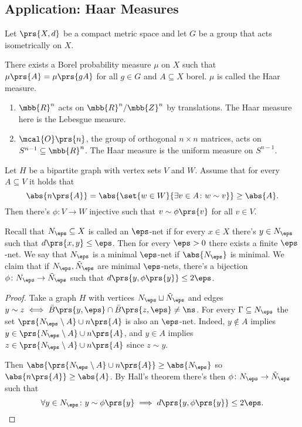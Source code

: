 \documentclass[10pt, twoside]{book}
\begin{document}
\subsection{Application: Haar Measures}

Let $\prs{X,d}$ be a compact metric space and let $G$ be a group that acts isometrically on $X$.

\begin{theorem}\label{theorem:hahr_measure}
There exists a Borel probability measure $\mu$ on $X$ such that $\mu\prs{A} = \mu\prs{gA}$ for all $g \in G$ and $A \subseteq X$ borel. $\mu$ is called the Haar measure.
\end{theorem}

\begin{example}
\begin{enumerate}
\item $\mbb{R}^n$ acts on $\mbb{R}^n/\mbb{Z}^n$ by translations. The Haar measure here is the Lebesgue measure.
\item $\mcal{O}\prs{n}$, the group of orthogonal $n\times n$ matrices, acts on $S^{n-1} \subseteq \mbb{R}^n$. The Haar measure is the uniform measure on $S^{n-1}$.
\end{enumerate}
\end{example}

\begin{theorem}
Let $H$ be a bipartite graph with vertex sets $V$ and $W$. Assume that for every $A \subseteq V$ it holds that
\[\abs{n\prs{A}} = \abs{\set{w \in W}{\exists v \in A \colon w \sim v}} \geq \abs{A} \text{.}\]
Then there's $\phi \colon V \to W$ injective such that $v \sim \phi\prs{v}$ for all $v \in V$.
\end{theorem}

\begin{lemma}
Recall that $N_\eps \subseteq X$ is called an $\eps$-net if for every $x \in X$ there's $y \in N_\eps$ such that $d\prs{x,y} \leq \eps$.
Then for every $\eps > 0$ there exists a finite $\eps$-net. We say that $N_\eps$ is a minimal $\eps$-net if $\abs{N_{\eps}}$ is minimal. We claim that if $N_\eps, \tilde{N}_\eps$ are minimal $\eps$-nets, there's a bijection $\phi \colon N_\eps \to \tilde{N}_\eps$ such that $d\prs{y, \phi\prs{y}} \leq 2 \eps$.
\end{lemma}

\begin{proof}
Take a graph $H$ with vertices $N_\eps \sqcup \tilde{N}_\eps$ and edges $y \sim z \iff \bar{B}\prs{y,\eps} \cap \bar{B}\prs{z,\eps} \neq \ns$. For every $\Gamma \subseteq N_\eps$ the set $\prs{N_\eps \setminus A} \cup n\prs{A}$ is also an $\eps$-net. Indeed, $y \notin A$ implies $y \in \prs{N_{\eps} \setminus A} \cup n\prs{A}$, and $y \in A$ implies $z \in \prs{N_\eps \setminus A} \cup n\prs{A}$ since $z \sim y$.

Then $\abs{\prs{N_\eps \setminus A} \cup n\prs{A}} \geq \abs{N_\eps}$ so $\abs{n\prs{A}} \geq \abs{A}$.
By Hall's theorem there's then $\phi \colon N_\eps \to \tilde{N}_\eps$ such that
\[\forall y \in N_\eps \colon y \sim \phi\prs{y} \implies d \prs{y, \phi\prs{y}} \leq 2 \eps \text{.}\]
\end{proof}
\end{document}
